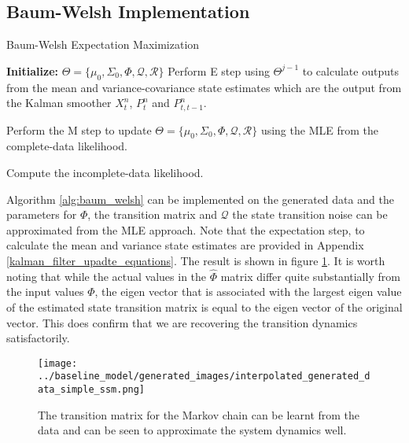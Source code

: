 \documentclass{article}
\begin{document}
\subsection{Baum-Welsh Implementation}

\begin{algorithm}
\caption{Baum-Welsh Expectation Maximization}\label{alg:baum_welsh}

  \begin{algorithmic}
  \STATE \textbf{Initialize:}  $\Theta = \mathbf{\{} \mu_0, \Sigma_0, \Phi, \mathcal{Q}, \mathcal{R} \mathbf{\}}$
    \STATE Perform E step using $\Theta^{j-1}$ to calculate outputs from the mean and variance-covariance state estimates which are the output from the Kalman smoother $X^n_t$, $P^n_t$ and $P^n_{t, t-1}$.

    \STATE Perform the M step to update $\Theta = \mathbf{\{} \mu_0, \Sigma_0, \Phi, \mathcal{Q}, \mathcal{R} \mathbf{\}}$ using the MLE from the complete-data likelihood.

    \STATE Compute the incomplete-data likelihood.
    \ENDWHILE
  \end{algorithmic}
\end{algorithm}

Algorithm \ref{alg:baum_welsh} can be implemented on the generated data and the parameters for $\Phi$, the transition matrix and $\mathcal{Q}$ the state transition noise can be approximated from the MLE approach. Note that the expectation step, to calculate the mean and variance state estimates are provided in Appendix \ref{kalman_filter_upadte_equations}. The result is shown in figure \ref{fig:interpolated_generated_data_simple_ssm}. It is worth noting that while the actual values in the $\hat{\Phi}$ matrix differ quite substantially from the input values $\Phi$, the eigen vector that is associated with the largest eigen value of the estimated state transition matrix is equal to the eigen vector of the original vector. This does confirm that we are recovering the transition dynamics satisfactorily.

\begin{figure}
\center
\texttt{[image: ../baseline\_model/generated\_images/interpolated\_generated\_data\_simple\_ssm.png]}
\caption{The transition matrix for the Markov chain can be learnt from the data and can be seen to approximate the system dynamics well.}\label{fig:interpolated_generated_data_simple_ssm}
\end{figure}
\end{document}
